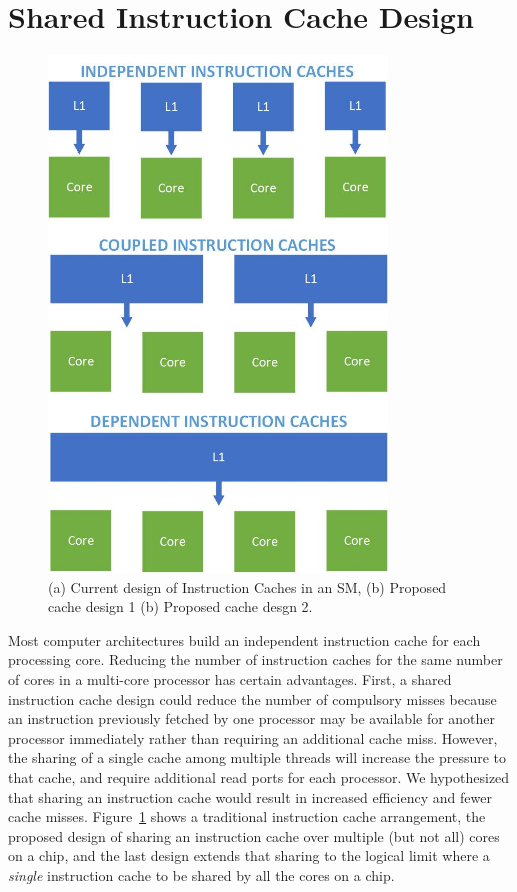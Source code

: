 \section{Shared Instruction Cache Design}

\begin{figure}[ht!]
\centering
\includegraphics[width=90mm]{graphics/InstructionCacheDesignSketches.jpg}
\caption{(a) Current design of Instruction Caches in an SM, (b) Proposed cache design 1 (b) Proposed cache desgn 2.}
\label{propDesign}
\end{figure}

Most computer architectures build an independent instruction cache for
each processing core.
Reducing the number of instruction caches for the same number of cores
in a multi-core processor has certain advantages. 
First, a shared instruction cache design could reduce the number of
compulsory misses because an instruction previously fetched
by one processor may be available for another processor immediately
rather than requiring an additional cache miss. 
However, the sharing of a single cache among multiple threads will
increase the pressure to that cache, and require additional read ports
for each processor.
We hypothesized that sharing an instruction cache would result in
increased efficiency and fewer cache misses. 
Figure~\ref{propDesign} shows a traditional instruction cache
arrangement, the proposed design of sharing an instruction cache over
multiple (but not all) cores on a chip, and the last design extends
that sharing to the logical limit where a \emph{single} instruction
cache to be shared by all the cores on a chip.
 




